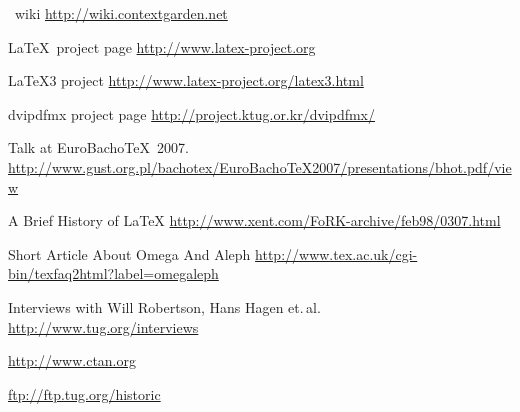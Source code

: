 \documentclass{scrartcl}
\begin{document}
\begin{thebibliography}{10}
	\vspace{2ex}
	\vspace{1ex}
	\ConTeXt\ wiki
	\newblock \url{http://wiki.contextgarden.net}
	
	{\LaTeX\ project page}
	\newblock \url{http://www.latex-project.org}
	
	{\LaTeX3 project}
	\newblock \url{http://www.latex-project.org/latex3.html}
	
	\vspace{2ex}
	\vspace{1ex}
	{dvipdfmx project page}
	\newblock \url{http://project.ktug.or.kr/dvipdfmx/}
	
	\vspace{2ex}
	\vspace{1ex}
	\newblock Talk at EuroBacho\TeX\ 2007.\\
	\newblock \url{http://www.gust.org.pl/bachotex/EuroBachoTeX2007/presentations/bhot.pdf/view}
	
	{A Brief History of \LaTeX}
	\newblock \url{http://www.xent.com/FoRK-archive/feb98/0307.html}
	
	{Short Article About Omega And Aleph}
	\newblock \url{http://www.tex.ac.uk/cgi-bin/texfaq2html?label=omegaleph}
	
	{Interviews with Will Robertson, Hans Hagen et.\,al.}
	\newblock \url{http://www.tug.org/interviews}
	
	\vspace{2ex}
	\vspace{1ex}
	
	\newblock \url{http://www.ctan.org}
	
	\newblock \url{ftp://ftp.tug.org/historic}
\end{thebibliography}

\label{sec:text}
\end{document}
